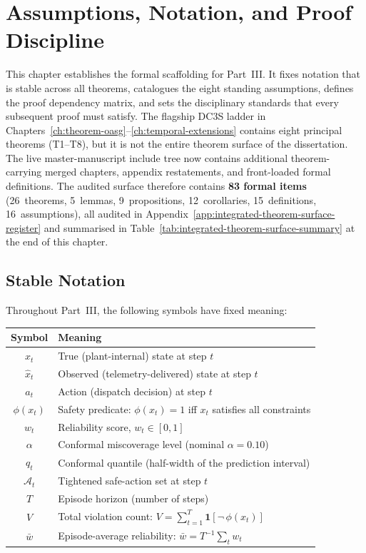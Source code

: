 
\section{Assumptions, Notation, and Proof Discipline}
\label{ch:assumptions}

This chapter establishes the formal scaffolding for Part~III.  It fixes
notation that is stable across all theorems, catalogues the eight
standing assumptions, defines the proof dependency matrix, and sets the
disciplinary standards that every subsequent proof must satisfy.  The
flagship DC3S ladder in Chapters~\ref{ch:theorem-oasg}--\ref{ch:temporal-extensions}
contains eight principal theorems (T1--T8), but it is not the entire theorem
surface of the dissertation.  The live master-manuscript include tree now
contains additional theorem-carrying merged chapters, appendix restatements,
and front-loaded formal definitions.  The audited surface therefore contains
\textbf{83 formal items} (26~theorems, 5~lemmas, 9~propositions,
12~corollaries, 15~definitions, 16~assumptions), all audited in
Appendix~\ref{app:integrated-theorem-surface-register} and summarised in
Table~\ref{tab:integrated-theorem-surface-summary} at the end of this chapter.

\subsection{Stable Notation}

Throughout Part~III, the following symbols have fixed meaning:

\begin{center}
\begin{tabular}{cl}
\toprule
\textbf{Symbol} & \textbf{Meaning} \\
\midrule
$x_t$ & True (plant-internal) state at step $t$ \\
$\hat{x}_t$ & Observed (telemetry-delivered) state at step $t$ \\
$a_t$ & Action (dispatch decision) at step $t$ \\
$\phi(x_t)$ & Safety predicate: $\phi(x_t) = 1$ iff $x_t$ satisfies all constraints \\
$w_t$ & Reliability score, $w_t \in [0,1]$ \\
$\alpha$ & Conformal miscoverage level (nominal $\alpha = 0.10$) \\
$q_t$ & Conformal quantile (half-width of the prediction interval) \\
$\mathcal{A}_t$ & Tightened safe-action set at step $t$ \\
$T$ & Episode horizon (number of steps) \\
$V$ & Total violation count: $V = \sum_{t=1}^T \mathbf{1}[\lnot\,\phi(x_t)]$ \\
$\bar{w}$ & Episode-average reliability: $\bar{w} = T^{-1}\sum_t w_t$ \\
\bottomrule
\end{tabular}
\end{center}

